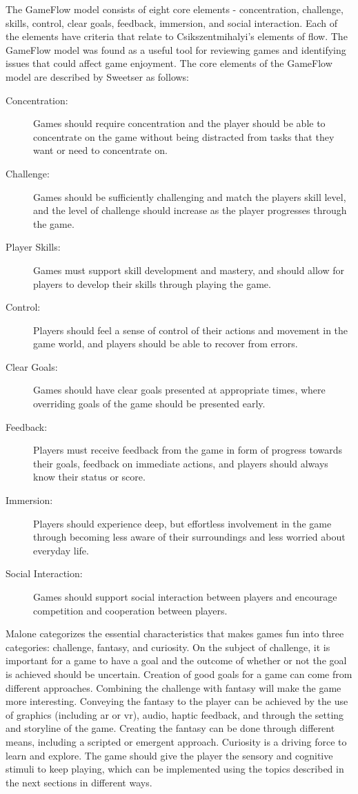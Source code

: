 The GameFlow model consists of eight core elements - concentration, challenge, skills, control, clear goals, feedback, immersion, and social interaction. Each of the elements have criteria that relate to Csikszentmihalyi's elements of flow. The GameFlow model was found as a useful tool for reviewing games and identifying issues that could affect game enjoyment. The core elements of the GameFlow model are described by Sweetser \cite{sweetser2005gameflow} as follows: 
\begin{description}
\item[Concentration:] Games should require concentration and the player should be able to concentrate on the game without being distracted from tasks that they want or need to concentrate on. 
\item[Challenge:] Games should be sufficiently challenging and match the players skill level, and the level of challenge should increase as the player progresses through the game. 
\item[Player Skills:] Games must support skill development and mastery, and should allow for players to develop their skills through playing the game. 
\item[Control:] Players should feel a sense of control of their actions and movement in the game world, and players should be able to recover from errors. 
\item[Clear Goals:] Games should have clear goals presented at appropriate times, where overriding goals of the game should be presented early. 
\item[Feedback:] Players must receive feedback from the game in form of progress towards their goals, feedback on immediate actions, and players should always know their status or score. 
\item[Immersion:] Players should experience deep, but effortless involvement in the game through becoming less aware of their surroundings and less worried about everyday life. 
\item[Social Interaction:] Games should support social interaction between players and encourage competition and cooperation between players.
\end{description}

Malone \cite{malone1980makes} categorizes the essential characteristics that makes games fun into three categories: challenge, fantasy, and curiosity.
On the subject of challenge, it is important for a game to have a goal and the outcome of whether or not the goal is achieved should be uncertain.
Creation of good goals for a game can come from different approaches.
Combining the challenge with fantasy will make the game more interesting.
Conveying the fantasy to the player can be achieved by the use of graphics (including \gls{ar} or \gls{vr}), audio, haptic feedback, and through the setting and storyline of the game.
Creating the fantasy can be done through different means, including a scripted or emergent approach.
Curiosity is a driving force to learn and explore.
The game should give the player the sensory and cognitive stimuli to keep playing, which can be implemented using the topics described in the next sections in different ways.


